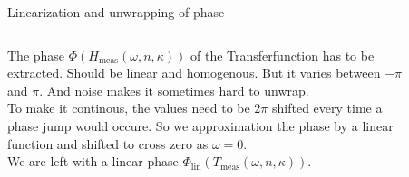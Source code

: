 \documentclass[aspectratio=1610, 9pt]{beamer}
\begin{document}
\begin{frame}{Linearization and unwrapping of phase}
  \begin{columns}
    \begin{column}{0.4\textwidth}
      The phase $\Phi(H_\text{meas}(\omega, n, \kappa))$ of the Transferfunction has to be extracted.
      Should be linear and homogenous.
      But it varies between $-\pi$ and $\pi$. And noise makes it sometimes hard to unwrap.\\
      \vspace*{0.5cm}
      To make it continous, the values need to be $2\pi$ shifted every time a phase jump would occure.
      So we approximation the phase by a linear function and shifted to cross zero as $\omega=0$.\\
      We are left with a linear phase $\Phi_\text{lin}(T_\text{meas}(\omega, n, \kappa))$.
    \end{column}
    \begin{column}{0.6\textwidth}
      \begin{figure}
      \end{figure}
    \end{column}
  \end{columns}
\end{frame}
\end{document}
